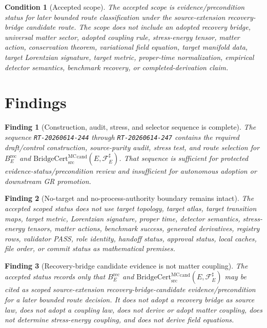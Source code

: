 \documentclass[11pt]{article}
\newcommand{\BridgeCert}{\mathrm{BridgeCert}_{\mathrm{src}}^{\mathrm{MC}}}
\newcommand{\BErec}{B_E^{\mathrm{rec}}}
\newtheorem{finding}{Finding}
\newtheorem{condition}{Condition}
\begin{document}
\begin{condition}[Accepted scope]
The accepted scope is evidence/precondition status for later bounded route
classification under the source-extension recovery-bridge candidate route.
The scope does not include an adopted recovery bridge, universal matter
sector, adopted coupling rule, stress-energy tensor, matter action,
conservation theorem, variational field equation, target manifold data,
target Lorentzian signature, target metric, proper-time normalization,
empirical detector semantics, benchmark recovery, or completed-derivation
claim.
\end{condition}

\section{Findings}

\begin{finding}[Construction, audit, stress, and selector sequence is complete]
The sequence \texttt{RT-20260614-244} through \texttt{RT-20260614-247}
contains the required draft/control construction, source-purity audit,
stress test, and route selection for \(\BErec\) and
\(\BridgeCert^{\mathrm{cand}}(E,\mathcal{F}_E^\sharp)\). That sequence is
sufficient for protected evidence-status/precondition review and insufficient
for autonomous adoption or downstream GR promotion.
\end{finding}

\begin{finding}[No-target and no-process-authority boundary remains intact]
The accepted scoped status does not use target topology, target atlas, target
transition maps, target metric, Lorentzian signature, proper time, detector
semantics, stress-energy tensors, matter actions, benchmark success,
generated derivatives, registry rows, validator PASS, role identity, handoff
status, approval status, local caches, file order, or commit status as
mathematical premises.
\end{finding}

\begin{finding}[Recovery-bridge candidate evidence is not matter coupling]
The accepted status records only that \(\BErec\) and
\(\BridgeCert^{\mathrm{cand}}(E,\mathcal{F}_E^\sharp)\) may be cited as
scoped source-extension recovery-bridge-candidate evidence/precondition for a
later bounded route decision. It does not adopt a recovery bridge as source
law, does not adopt a coupling law, does not derive or adopt matter coupling,
does not determine stress-energy coupling, and does not derive field
equations.
\end{finding}
\end{document}
